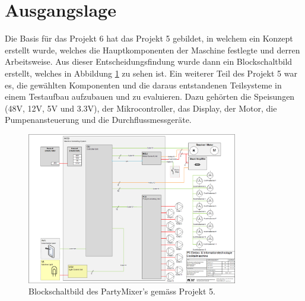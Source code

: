 \section{Ausgangslage}
\label{sec:Ausgangslage}

Die Basis für das Projekt 6 hat das Projekt 5 gebildet, in welchem ein Konzept erstellt wurde, welches die Hauptkomponenten der Maschine festlegte und derren Arbeitsweise. Aus dieser Entscheidungsfindung wurde dann ein Blockschaltbild erstellt, welches in Abbildung \ref{fig:P5_Blockschaltbild_Partymixer} zu sehen ist. Ein weiterer Teil des Projekt 5 war es, die gewählten Komponenten und die daraus entstandenen Teilsysteme in einem Testaufbau aufzubauen und zu evaluieren. Dazu gehörten die Speisungen (48V, 12V, 5V und 3.3V), der Mikrocontroller, das Display, der Motor, die Pumpenansteuerung und die Durchflussmessgeräte.

\begin{figure}[H]
\center
\includegraphics[angle=90, width = 0.82\textwidth]{graphics/P5-Blockschema}
\caption{Blockschaltbild des PartyMixer's gemäss Projekt 5.}
\label{fig:P5_Blockschaltbild_Partymixer}
\end{figure}

\newpage

